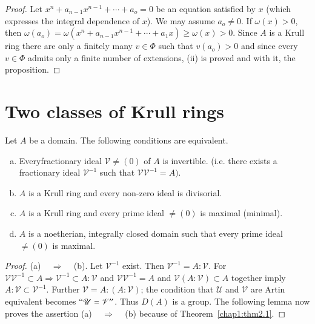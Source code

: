 \begin{proof}
Let $x^n + a_{n -1} x^{n-1} + \cdots + a_o = 0$ be an equation
satisfied by $x$ (which expresses the integral dependence of $x$). We
may assume $a_o \neq 0$. If $\omega (x) > 0$, then $\omega (a_o) =
\omega (x^n + a_{n - 1} x^{n-1} +  \cdots + a_1 x) \ge \omega (x) >
0$.  
Since $A$ is a Krull ring there are only a finitely many $v \in \Phi $
such that $v(a_o) > 0$ and since every $v \in \Phi$ admits only a
finite number of extensions, (ii) is proved and with it, the
proposition. 
\end{proof}  
  
\section{Two classes of Krull rings}\label{chap1:sec5}%

\begin{theorem}\label{chap1:thm5.1} %
Let $A$ be a domain. The following conditions are equivalent. 
\begin{enumerate}[(a)]
\item Every\pageoriginale fractionary ideal $\mathscr{V} \neq (0)$ of $A$ is
  invertible. (i.e. there exists a fractionary ideal
  $\mathscr{V}^{-1}$ such that $\mathscr{V} \mathscr{V}^{-1} = A)$. 

\item $A$ is a Krull ring and every non-zero ideal is
  divisorial. 

\item $A$ is a Krull ring and every prime ideal $\neq (0)$ is
  maximal (minimal). 

\item $A$ is a noetherian, integrally closed domain such that every
  prime ideal $\neq (0)$ is maximal. 
\end{enumerate}  
\end{theorem}  
  
\begin{proof}
(a) ~ $\Rightarrow$ ~ (b). Let $\mathscr{V}^{-1}$ exist. Then
    $\mathscr{V}^{-1} = A : \mathscr{V}$. For $\mathscr{V}
    \mathscr{V}^{-1} \subset A \Rightarrow \mathscr{V}^{-1} \subset A
    : \mathscr{V}$ and $\mathscr{V}\mathscr{V}^{-1} = A$ and
    $\mathscr{V} (A : \mathscr{V}) \subset A$ together imply $A :
    \mathscr{V} \subset \mathscr{V}^{-1}$. Further $\mathscr{V} = A :
    (A : \mathscr{V} )$; the condition that $\mathscr{U}$ and
    $\mathscr{V}$ are Artin equivalent becomes $`` \mathscr{U} =
    \mathscr{V}''$. Thus $D(A)$ is a group. The following lemma now
    proves the assertion (a) ~ $\Rightarrow$ ~ (b) because of 
Theorem~\ref{chap1:thm2.1}.   
\end{proof}  
  
